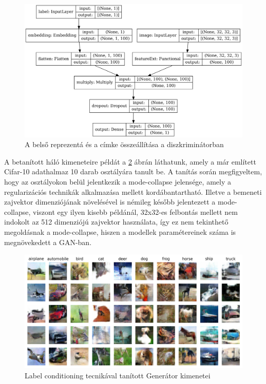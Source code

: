 \begin{figure}[h]
\centering
\includegraphics[width=13cm]{images/label_discriminator.png}
\caption{A belső reprezentá és a címke összeállítása a diszkriminátorban}
\label{fig:labeldiscriminator}
\end{figure}

A betanított háló kimeneteire példát a \ref{fig:labelconditioning} ábrán láthatunk, amely a már említett Cifar-10 adathalmaz 10 darab osztályára tanult be. A tanítás során megfigyeltem, hogy az osztályokon belül jelentkezik a mode-collapse jelensége, amely a regularizációs technikák alkalmazása mellett kordábantartható. Illetve a bemeneti zajvektor dimenziójának növelésével is némileg később jelentezett a mode-collapse, viszont egy ilyen kisebb példánál, 32x32-es felbontás mellett nem indokolt az 512 dimenziójú zajvektor használata, így ez nem tekinthető megoldásnak a mode-collapse, hiszen a modellek paramétereinek száma is megnövekedett a GAN-ban.

\begin{figure}[h]
\centering
\includegraphics[width=13cm]{images/label_conditioning.png}
\caption{Label conditioning tecnikával tanított Generátor kimenetei}
\label{fig:labelconditioning}
\end{figure}